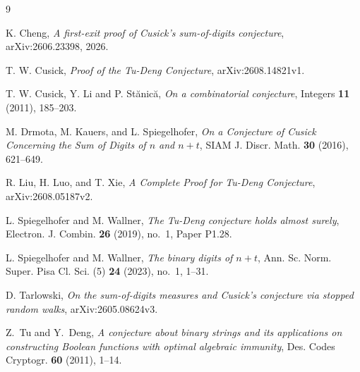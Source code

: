 \documentclass[11pt]{article}
\begin{document}
\begin{thebibliography}{9}

K. Cheng,
\emph{A first-exit proof of Cusick's sum-of-digits conjecture},
arXiv:2606.23398, 2026.

T. W. Cusick,
\emph{Proof of the Tu-Deng Conjecture},
arXiv:2608.14821v1.

T. W. Cusick, Y. Li and P. St\u{a}nic\u{a},
\emph{On a combinatorial conjecture},
Integers \textbf{11} (2011), 185--203.

M. Drmota, M. Kauers, and L. Spiegelhofer,
\emph{On a Conjecture of Cusick Concerning the Sum of Digits of $n$ and $n+t$},
SIAM J. Discr. Math. \textbf{30} (2016), 621--649.

R. Liu, H. Luo, and T. Xie,
\emph{A Complete Proof for Tu-Deng Conjecture},
arXiv:2608.05187v2.

L. Spiegelhofer and M. Wallner,
\emph{The Tu-Deng conjecture holds almost surely},
Electron. J. Combin. \textbf{26} (2019), no.~1, Paper P1.28.

L. Spiegelhofer and M. Wallner,
\emph{The binary digits of $n+t$},
Ann. Sc. Norm. Super. Pisa Cl. Sci. (5) \textbf{24} (2023), no.~1, 1--31.

D. Tarlowski,
\emph{On the sum-of-digits measures and Cusick's conjecture via stopped random walks},
arXiv:2605.08624v3.

Z.~Tu and Y.~Deng,
\emph{A conjecture about binary strings and its applications on constructing Boolean functions with optimal algebraic immunity},
Des. Codes Cryptogr. \textbf{60} (2011), 1--14.

\end{thebibliography}
\end{document}
